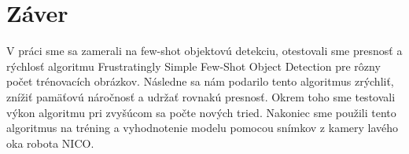 \chapter*{Záver}\label{chap:conclusion}
V práci sme sa zamerali na few-shot objektovú detekciu, otestovali sme presnosť a rýchlosť algoritmu Frustratingly Simple Few-Shot Object Detection \cite{FSFSODT} pre rôzny počet trénovacích obrázkov. Následne sa nám podarilo tento algoritmus zrýchliť, znížiť pamäťovú náročnosť a udržať rovnakú presnosť. Okrem toho sme testovali výkon algoritmu pri zvyšúcom sa počte nových tried. Nakoniec sme použili tento algoritmus na tréning a vyhodnotenie modelu pomocou snímkov z kamery lavého oka robota NICO. 
